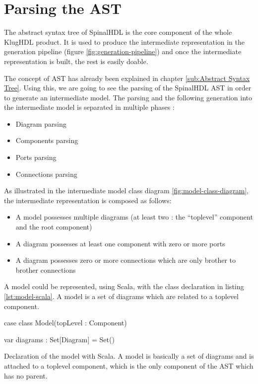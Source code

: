 \chapter{Parsing the AST}
\label{chap:parsing-ast}

The abstract syntax tree of SpinalHDL is the core component of the whole KlugHDL
product. It is used to produce the intermediate representation in the generation
pipeline (figure \ref{fig:generation-pipeline}) and once the intermediate
representation is built, the rest is easily doable.

The concept of AST has already been explained in chapter \ref{sub:Abstract Syntax
  Tree}. Using this, we are going to see the parsing of the SpinalHDL AST in
order to generate an intermediate model. The parsing and the following
generation into the intermediate model is separated in multiple
phases :

\begin{itemize}
\item Diagram parsing
\item Components parsing
\item Ports parsing
\item Connections parsing
\end{itemize}

As illustrated in the intermediate model class diagram
\ref{fig:model-class-diagram}, the intermediate representation is composed as follows:
\begin{itemize}
\item A model possesses multiple diagrams (at least two : the ``toplevel'' component and the
  root component)
\item A diagram possesses at least one component with zero or more ports
\item A diagram possesses zero or more connections which are only brother to
  brother connections
\end{itemize}

A model could be represented, using Scala, with the class declaration in listing
\ref{lst:model-scala}. A model is a set of diagrams which are related to a
toplevel component.

\begin{listing}[H]
  \centering
  \begin{scalacode}
    case class Model(topLevel : Component) {

      var diagrams : Set[Diagram] = Set()
  }
\end{scalacode}
\caption[Model class declaration]{Declaration of the model with Scala. A model
  is basically a set of diagrams and is attached to a toplevel component, which
  is the only component of the AST which has no parent.}
\label{lst:model-scala}
\end{listing}

